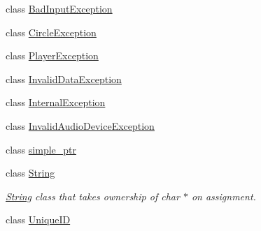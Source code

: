 \begin{DoxyCompactItemize}
\item 
class \hyperlink{classmaudio_1_1BadInputException}{Bad\-Input\-Exception}
\item 
class \hyperlink{classmaudio_1_1CircleException}{Circle\-Exception}
\item 
class \hyperlink{classmaudio_1_1PlayerException}{Player\-Exception}
\item 
class \hyperlink{classmaudio_1_1InvalidDataException}{Invalid\-Data\-Exception}
\item 
class \hyperlink{classmaudio_1_1InternalException}{Internal\-Exception}
\item 
class \hyperlink{classmaudio_1_1InvalidAudioDeviceException}{Invalid\-Audio\-Device\-Exception}
\item 
class \hyperlink{classmaudio_1_1simple__ptr}{simple\-\_\-ptr}
\item 
class \hyperlink{classmaudio_1_1String}{String}
\begin{DoxyCompactList}\small\item\em \hyperlink{classmaudio_1_1String}{String} class that takes ownership of char $\ast$ on assignment. \end{DoxyCompactList}\item 
class \hyperlink{classmaudio_1_1UniqueID}{Unique\-I\-D}
\end{DoxyCompactItemize}
